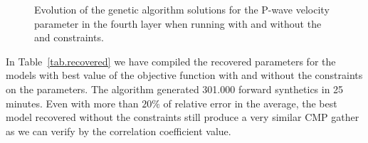 \documentclass{vie16}
\begin{document}
\begin{figure}[H]
\subfigtopskip-5pt
\caption{Evolution of the genetic algorithm solutions for the P-wave 
velocity parameter in the fourth layer when running with  
and without  the \cite{Gardner1974} and 
\cite{Castagna1985} constraints.
}
\label{fig2}
\end{figure}
\vspace{-0.8cm}
In Table~\ref{tab.recovered} we have compiled the recovered parameters for the
models with best value of the objective function
with and without the constraints on the
parameters. The algorithm generated 301.000 forward synthetics in
25 minutes. Even with more than $20\%$ of relative error in the
average, the best model recovered without the constraints still
produce a very similar CMP gather as we can verify by the
correlation coefficient value.

\end{document}
